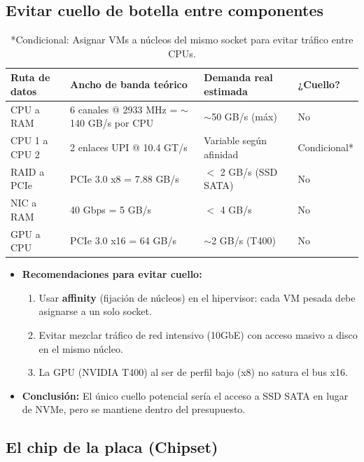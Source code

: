 \documentclass[12pt, letterpaper]{article}
\begin{document}
\subsection{Evitar cuello de botella entre componentes}

\begin{table}[!ht]
    \centering
    \caption{Análisis de cuellos de botella potenciales}
    \label{tab:bottleneck}
    \begin{tabular}{p{4.5cm}p{4cm}p{4cm}p{2.5cm}}
        \toprule
        \textbf{Ruta de datos} & \textbf{Ancho de banda teórico} & \textbf{Demanda real estimada} & \textbf{¿Cuello?} \\
        \midrule
        CPU a RAM & 6 canales @ 2933 MHz = $\sim$140 GB/s por CPU & $\sim$50 GB/s (máx) & No \\
        CPU 1 a CPU 2 & 2 enlaces UPI @ 10.4 GT/s & Variable según afinidad & Condicional* \\
        RAID a PCIe & PCIe 3.0 x8 = 7.88 GB/s & $<$ 2 GB/s (SSD SATA) & No \\
        NIC a RAM & 40 Gbps = 5 GB/s & $<$ 4 GB/s & No \\
        GPU a CPU & PCIe 3.0 x16 = 64 GB/s & $\sim$2 GB/s (T400) & No \\
        \bottomrule
    \end{tabular}
    \caption*{*Condicional: Asignar VMs a núcleos del mismo socket para evitar tráfico entre CPUs.}
\end{table}

\begin{itemize}
    \item \textbf{Recomendaciones para evitar cuello:}
        \begin{enumerate}
            \item Usar \textbf{affinity} (fijación de núcleos) en el hipervisor: cada VM pesada debe asignarse a un solo socket.
            \item Evitar mezclar tráfico de red intensivo (10GbE) con acceso masivo a disco en el mismo núcleo.
            \item La GPU (NVIDIA T400) al ser de perfil bajo (x8) no satura el bus x16.
        \end{enumerate}
    \item \textbf{Conclusión:} El único cuello potencial sería el acceso a SSD SATA en lugar de NVMe, pero se mantiene dentro del presupuesto.
\end{itemize}

\subsection{El chip de la placa (Chipset)}
\end{document}
